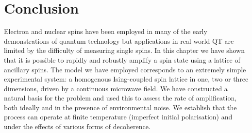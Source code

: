 



\section{Conclusion}

Electron and nuclear spins have been employed in many of the early demonstrations of quantum technology but applications in real world QT are limited by the difficulty of measuring single spins. In this chapter we have shown that it is possible to rapidly and robustly amplify a spin state using a lattice of ancillary spins. The model we have employed corresponds to an extremely simple experimental system: a homogenous Ising-coupled spin lattice in one, two or three dimensions, driven by a continuous microwave field. We have constructed a natural basis for the problem and used this to assess the rate of amplification, both ideally and in the presence of environmental noise. We establish that the process can operate at finite temperature (imperfect initial polarisation) and under the effects of various forms of decoherence.
